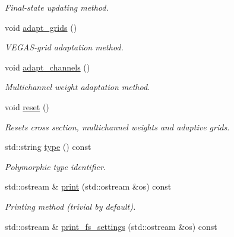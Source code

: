 \begin{DoxyCompactItemize}
\begin{DoxyCompactList}\small\item\em Final-\/state updating method. \end{DoxyCompactList}\item 
\hypertarget{a00446_aea3bf4452d916c6f2bcee3113b95757d}{void \hyperlink{a00446_aea3bf4452d916c6f2bcee3113b95757d}{adapt\-\_\-grids} ()}\label{a00446_aea3bf4452d916c6f2bcee3113b95757d}

\begin{DoxyCompactList}\small\item\em V\-E\-G\-A\-S-\/grid adaptation method. \end{DoxyCompactList}\item 
\hypertarget{a00446_a33c57e0755699c912dde1bebf87e2dcc}{void \hyperlink{a00446_a33c57e0755699c912dde1bebf87e2dcc}{adapt\-\_\-channels} ()}\label{a00446_a33c57e0755699c912dde1bebf87e2dcc}

\begin{DoxyCompactList}\small\item\em Multichannel weight adaptation method. \end{DoxyCompactList}\item 
\hypertarget{a00446_a90bbb01bed864774aca7f08af0a33982}{void \hyperlink{a00446_a90bbb01bed864774aca7f08af0a33982}{reset} ()}\label{a00446_a90bbb01bed864774aca7f08af0a33982}

\begin{DoxyCompactList}\small\item\em Resets cross section, multichannel weights and adaptive grids. \end{DoxyCompactList}\item 
\hypertarget{a00446_ad12e96c4671fa9f80e02b583a0a809a0}{std\-::string \hyperlink{a00446_ad12e96c4671fa9f80e02b583a0a809a0}{type} () const }\label{a00446_ad12e96c4671fa9f80e02b583a0a809a0}

\begin{DoxyCompactList}\small\item\em Polymorphic type identifier. \end{DoxyCompactList}\item 
\hypertarget{a00446_acaa154d05a67743f3d0c96f6d798dd23}{std\-::ostream \& \hyperlink{a00446_acaa154d05a67743f3d0c96f6d798dd23}{print} (std\-::ostream \&os) const }\label{a00446_acaa154d05a67743f3d0c96f6d798dd23}

\begin{DoxyCompactList}\small\item\em Printing method (trivial by default). \end{DoxyCompactList}\item 
\hypertarget{a00446_a8f6ff3a7679066e2fd934b7df1a3021d}{std\-::ostream \& \hyperlink{a00446_a8f6ff3a7679066e2fd934b7df1a3021d}{print\-\_\-fs\-\_\-settings} (std\-::ostream \&os) const }\label{a00446_a8f6ff3a7679066e2fd934b7df1a3021d}


\end{DoxyCompactItemize}
